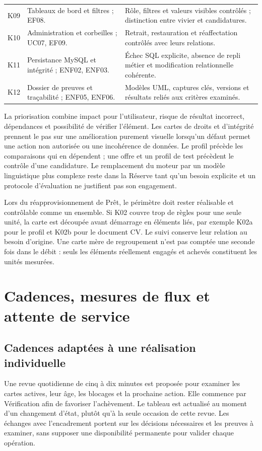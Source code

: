 \begin{longtable}{@{}P{0.13\textwidth}P{0.36\textwidth}P{0.43\textwidth}@{}}
K09 & Tableaux de bord et filtres ; EF08. & Rôle, filtres et valeurs visibles contrôlés ; distinction entre vivier et candidatures. \\
K10 & Administration et corbeilles ; UC07, EF09. & Retrait, restauration et réaffectation contrôlés avec leurs relations. \\
K11 & Persistance MySQL et intégrité ; ENF02, ENF03. & Échec SQL explicite, absence de repli métier et modification relationnelle cohérente. \\
K12 & Dossier de preuves et traçabilité ; ENF05, ENF06. & Modèles UML, captures clés, versions et résultats reliés aux critères examinés. \\
\bottomrule
\end{longtable}
\endgroup

La priorisation combine impact pour l'utilisateur, risque de résultat incorrect, dépendances et possibilité de vérifier l'élément. Les cartes de droits et d'intégrité prennent le pas sur une amélioration purement visuelle lorsqu'un défaut permet une action non autorisée ou une incohérence de données. Le profil précède les comparaisons qui en dépendent ; une offre et un profil de test précèdent le contrôle d'une candidature. Le remplacement du moteur par un modèle linguistique plus complexe reste dans la Réserve tant qu'un besoin explicite et un protocole d'évaluation ne justifient pas son engagement.

Lors du réapprovisionnement de Prêt, le périmètre doit rester réalisable et contrôlable comme un ensemble. Si K02 couvre trop de règles pour une seule unité, la carte est découpée avant démarrage en éléments liés, par exemple K02a pour le profil et K02b pour le document CV. Le suivi conserve leur relation au besoin d'origine. Une carte mère de regroupement n'est pas comptée une seconde fois dans le débit : seuls les éléments réellement engagés et achevés constituent les unités mesurées.

\section{Cadences, mesures de flux et attente de service}
\label{sec:mesures-kanban}

\subsection{Cadences adaptées à une réalisation individuelle}

Une revue quotidienne de cinq à dix minutes est proposée pour examiner les cartes actives, leur âge, les blocages et la prochaine action. Elle commence par Vérification afin de favoriser l'achèvement. Le tableau est actualisé au moment d'un changement d'état, plutôt qu'à la seule occasion de cette revue. Les échanges avec l'encadrement portent sur les décisions nécessaires et les preuves à examiner, sans supposer une disponibilité permanente pour valider chaque opération.

